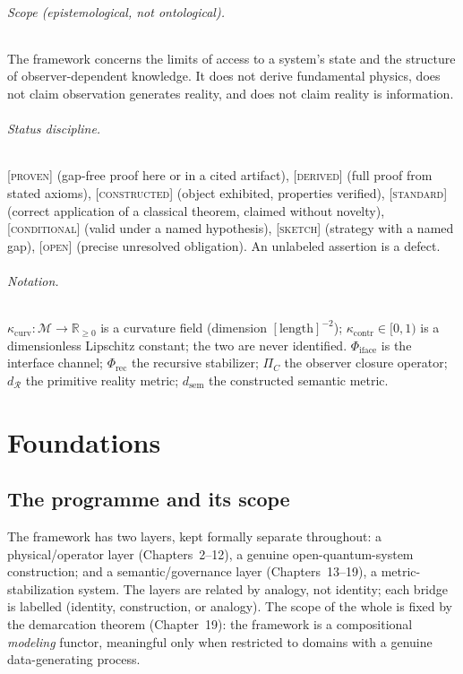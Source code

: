 \documentclass[11pt]{report}
\theoremstyle{plain}
\theoremstyle{definition}
\theoremstyle{remark}
\newcommand{\status}[1]{\par\smallskip\noindent{\footnotesize\textsc{Status:}~#1}\par}
\newcommand{\PROVEN}{\textsc{[proven]}}
\newcommand{\DERIVED}{\textsc{[derived]}}
\newcommand{\CONSTRUCTED}{\textsc{[constructed]}}
\newcommand{\STANDARD}{\textsc{[standard]}}
\newcommand{\OPENs}{\textsc{[open]}}
\newcommand{\SKETCH}{\textsc{[sketch]}}
\newcommand{\COND}{\textsc{[conditional]}}
\newcommand{\Real}{\mathcal{R}}
\newcommand{\dsem}{d_{\mathrm{sem}}}
\newcommand{\Phiface}{\Phi_{\mathrm{iface}}}
\newcommand{\Phirec}{\Phi_{\mathrm{rec}}}
\newcommand{\PiC}{\Pi_{C}}
\newcommand{\kcurv}{\kappa_{\mathrm{curv}}}
\newcommand{\kcontr}{\kappa_{\mathrm{contr}}}
\begin{document}
\paragraph{Scope (epistemological, not ontological).} The framework concerns the
limits of access to a system's state and the structure of observer-dependent
knowledge. It does not derive fundamental physics, does not claim observation
generates reality, and does not claim reality is information.

\paragraph{Status discipline.} \PROVEN{} (gap-free proof here or in a cited
artifact), \DERIVED{} (full proof from stated axioms), \CONSTRUCTED{} (object
exhibited, properties verified), \STANDARD{} (correct application of a classical
theorem, claimed without novelty), \COND{} (valid under a named hypothesis),
\SKETCH{} (strategy with a named gap), \OPENs{} (precise unresolved obligation). An
unlabeled assertion is a defect.

\paragraph{Notation.} $\kcurv:\mathcal M\to\mathbb R_{\ge0}$ is a curvature field
(dimension $[\text{length}]^{-2}$); $\kcontr\in[0,1)$ is a dimensionless Lipschitz
constant; the two are never identified. $\Phiface$ is the interface channel;
$\Phirec$ the recursive stabilizer; $\PiC$ the observer closure operator; $d_\Real$
the primitive reality metric; $\dsem$ the constructed semantic metric.

\part{Foundations}

\chapter{The programme and its scope}
The framework has two layers, kept formally separate throughout: a physical/operator
layer (Chapters~2--12), a genuine open-quantum-system construction; and a
semantic/governance layer (Chapters~13--19), a metric-stabilization system. The layers
are related by analogy, not identity; each bridge is labelled (identity, construction,
or analogy). The scope of the whole is fixed by the demarcation theorem
(Chapter~19): the framework is a compositional \emph{modeling} functor, meaningful only
when restricted to domains with a genuine data-generating process.
\status{\STANDARD{} (programmatic).}
\end{document}
